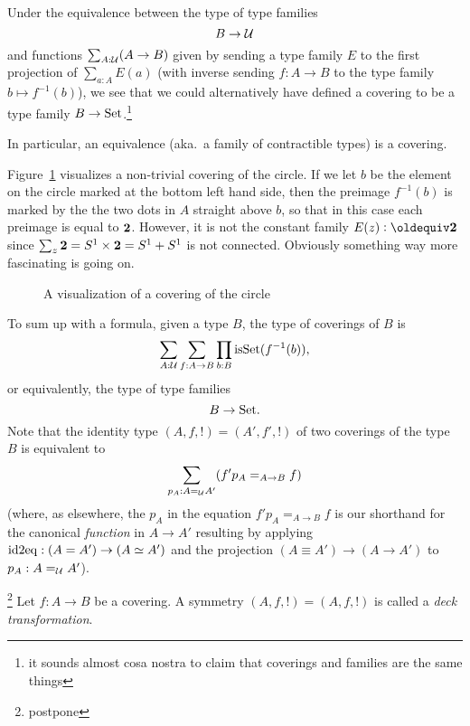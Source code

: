 \begin{remark}\label{rem:coveringsasfamilies}
  Under the equivalence between the type of type families 
$$B\to\mathcal{U}$$ and functions $\sum_{A:\mathcal{U}}(A\to B)$ given by sending a type family $E$ to the first projection of $\sum_{a:A}E(a)$ (with inverse sending $f:A\to B$ to the type family $b\mapsto f^{-1}(b)$), we see that we could alternatively have defined a covering to be a type family $B\to\mathord{\mathrm{Set}}$.\footnote{it sounds almost cosa nostra to claim that coverings and families are the same things}  

In particular, an equivalence (aka.~a family of contractible types) is a covering.
\end{remark}


 Figure~\ref{fig:covering} visualizes a non-trivial covering of the circle.  If we let $b$ be the element on the circle marked at the bottom left hand side, then the preimage $f^{-1}(b)$ is marked by the the two dots in $A$ straight above $b$, so that in this case each preimage is equal to $\mathbf{2}$.  However, it is not the constant family $E(z)\defequi\bn 2$ since $\sum_{z}\mathbf{2}=S^1\times\mathbf{2}=S^1+S^1$ is not connected.  Obviously something way more fascinating is going on.
\begin{figure}
  \centering
  \caption{A visualization of a covering of the circle}
  \label{fig:covering}
\end{figure}



To sum up with a formula, 
given a type $B$, the type of coverings of $B$ is
$$\sum_{A:\mathcal{U}}\sum_{f:A\to B}\prod_{b:B}\mathrm{isSet}(f^{-1}(b)),$$ 
or equivalently, the type of type families
$$B\to\mathord{\mathrm{Set}}.$$
Note that the identity type  $(A,f,!)=(A',f',!)$ of two coverings of the type $B$ is equivalent to 
$$\sum_{p_A:A=_{\mathcal{U}}A'}(f'p_A=_{A\to B}f)$$
(where, as elsewhere, the $p_A$ in the equation $f'p_A=_{A\to B}f$ is our shorthand for the canonical \emph{function} in $A\to A'$ resulting by applying $\mathrm{id2eq}:(A=A')\to (A\simeq A')$ and the projection $(A\equiv A')\to(A\to A')$ to $p_A:A=_{\mathcal{U}}A'$).
\begin{definition}\label{def:decktrafo}\footnote{postpone}
  Let $f:A\to B$ be a covering.  A symmetry $(A,f,!)=(A,f,!)$ is called a \emph{deck transformation}.
\end{definition}

